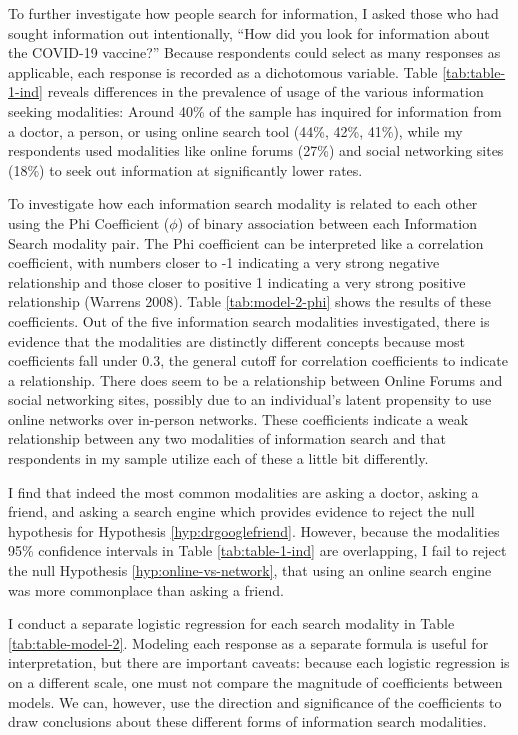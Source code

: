 To further investigate how people search for information, I asked those who had
sought information out intentionally, ``How did you look for information about
the COVID-19 vaccine?'' Because respondents could select as many responses as
applicable, each response is recorded as a dichotomous variable. Table
\ref{tab:table-1-ind} reveals differences in the prevalence of usage of the
various information seeking modalities: Around 40\% of the sample has inquired
for information from a doctor, a person, or using online search tool (44\%,
42\%, 41\%), while my respondents used modalities like online forums (27\%) and
social networking sites (18\%) to seek out information at significantly lower
rates.

To investigate how each information search modality is related to each other
using the Phi Coefficient ($\phi$) of binary association between each
Information Search modality pair. The Phi coefficient can be interpreted like a
correlation coefficient, with numbers closer to -1 indicating a very strong
negative relationship and those closer to positive 1 indicating a very strong
positive relationship (Warrens 2008). Table \ref{tab:model-2-phi} shows the
results of these coefficients. Out of the five information search modalities
investigated, there is evidence that the modalities are distinctly different
concepts because most coefficients fall under 0.3, the general cutoff for
correlation coefficients to indicate a relationship. There does seem to be a
relationship between Online Forums and social networking sites, possibly due to
an individual's latent propensity to use online networks over in-person
networks. These coefficients indicate a weak relationship between any two
modalities of information search and that respondents in my sample utilize each
of these a little bit differently.

I find that indeed the most common modalities are asking a doctor, asking a
friend, and asking a search engine which provides evidence to reject the null
hypothesis for Hypothesis
\ref{hyp:drgooglefriend}. However, because the modalities 95\% confidence
intervals in Table \ref{tab:table-1-ind} are overlapping, I fail to reject 
the null Hypothesis \ref{hyp:online-vs-network}, that using an online search
engine was more commonplace than asking a friend.



I conduct a separate logistic regression for each search modality in Table
\ref{tab:table-model-2}. Modeling each response as a separate formula is useful
for interpretation, but there are important caveats: because each logistic
regression is on a different scale, one must not compare the magnitude of
coefficients between models. We can, however, use the direction and significance
of the coefficients to draw conclusions about these different forms of
information search modalities.

